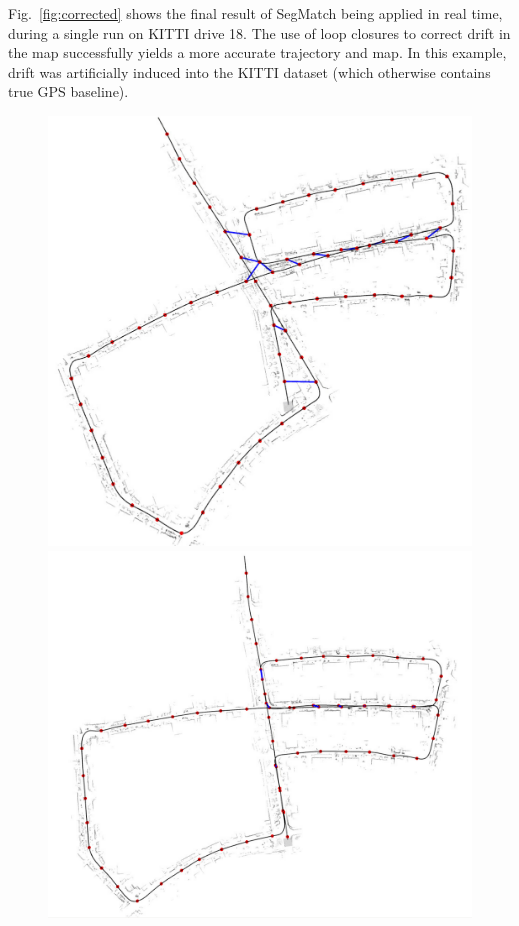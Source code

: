 Fig.~\ref{fig:corrected} shows the final result of SegMatch being applied in real time, during a single run on KITTI drive 18. The use of loop closures to correct drift in the map successfully yields a more accurate trajectory and map. In this example, drift was artificially induced into the KITTI dataset (which otherwise contains true GPS baseline).\\

\begin{figure}[!tbp]
  \centering
  \begin{minipage}[b]{0.4\textwidth}
    \includegraphics[width=\textwidth]{images/before_segmatch.pdf}
  \end{minipage}
  \hfill
  \begin{minipage}[b]{0.4\textwidth}
    \includegraphics[width=\textwidth]{images/after_segmatch.pdf}

\end{minipage}
\end{figure}
